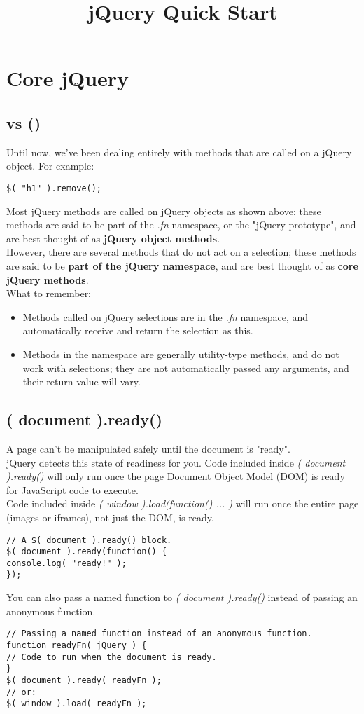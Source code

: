 \documentclass[10pt,letterpaper]{book}
\begin{document}
\title{jQuery Quick Start}

\chapter{Core jQuery}
\section{\textdollar vs \textdollar()}
Until now, we've been dealing entirely with methods that are called on a jQuery object. For example:
\begin{lstlisting}
$( "h1" ).remove();
\end{lstlisting}
Most jQuery methods are called on jQuery objects as shown above; these methods are said to be part of the \textit{\textdollar.fn} namespace, or the "jQuery prototype", and are best thought of as \textbf{jQuery object methods}.\\
However, there are several methods that do not act on a selection; these methods are said to be \textbf{part of the jQuery namespace}, and are best thought of as \textbf{core jQuery methods}.\\
What to remember:

\begin{itemize}
\item Methods called on jQuery selections are in the \textit{\textdollar.fn} namespace, and automatically receive and return the selection as this.
\item Methods in the \textdollar namespace are generally utility-type methods, and do not work with selections; they are not automatically passed any arguments, and their return value will vary.
\end{itemize}
\section{\textdollar( document ).ready()}
A page can't be manipulated safely until the document is "ready".\\
jQuery detects this state of readiness for you. Code included inside \textit{\textdollar( document ).ready()} will only run once the page Document Object Model (DOM) is ready for JavaScript code to execute.\\
Code included inside \textit{\textdollar( window ).load(function() { ... })} will run once the entire page (images or iframes), not just the DOM, is ready.
\begin{lstlisting}
// A $( document ).ready() block.
$( document ).ready(function() {
console.log( "ready!" );
});
\end{lstlisting}
You can also pass a named function to \textit{\textdollar( document ).ready()} instead of passing an anonymous function.
\begin{lstlisting}
// Passing a named function instead of an anonymous function.
function readyFn( jQuery ) {
// Code to run when the document is ready.
}
$( document ).ready( readyFn );
// or:
$( window ).load( readyFn );
\end{lstlisting}
\end{document}
